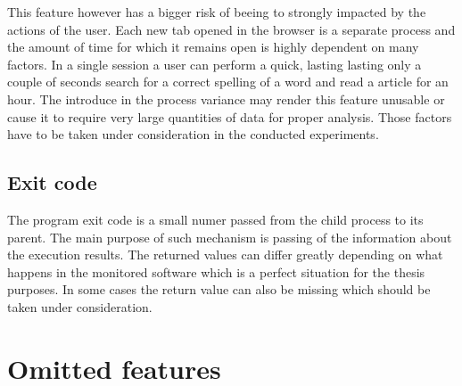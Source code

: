 \documentclass[a4paper,twoside,12pt]{book}
\begin{document}
This feature however has a bigger risk of beeing to strongly impacted by the actions of the user. 
Each new tab opened in the browser is a separate process and the amount of time for which it remains
open is highly dependent on many factors. In a single session a user can perform a quick, lasting 
lasting only a couple of seconds search for a correct spelling of a word and read a article for 
an hour. The introduce in the process variance may render this feature unusable or cause it to
require very large quantities of data for proper analysis. Those factors have to be taken 
under consideration in the conducted experiments.


\subsection{Exit code}

The program exit code is a small numer passed from the child process to its parent. The main purpose 
of such mechanism is passing of the information about the execution results. The returned values
can differ greatly depending on what happens in the monitored software which is a perfect situation
for the thesis purposes. In some cases the return value can also be missing which should be taken 
under consideration.

\section{Omitted features}

\end{document}
